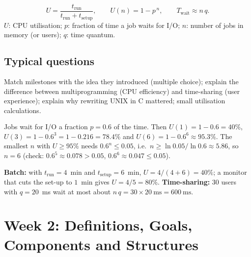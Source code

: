 \documentclass[11pt,a4paper]{article}
\begin{document}
\begin{keyidea}
\[
U = \frac{t_{\text{run}}}{t_{\text{run}} + t_{\text{setup}}}, \qquad
U(n) = 1 - p^{\,n}, \qquad
T_{\text{wait}} \approx n\,q .
\]
$U$: CPU utilisation; $p$: fraction of time a job waits for I/O; $n$: number of jobs in memory (or users); $q$: time quantum.
\end{keyidea}

\subsection*{Typical questions}
Match milestones with the idea they introduced (multiple choice); explain the difference between multiprogramming (CPU efficiency) and time-sharing (user experience); explain why rewriting UNIX in C mattered; small utilisation calculations.

\begin{example}
Jobs wait for I/O a fraction $p = 0.6$ of the time. Then $U(1) = 1 - 0.6 = 40\%$, $U(3) = 1 - 0.6^{3} = 1 - 0.216 = 78.4\%$ and $U(6) = 1 - 0.6^{6} \approx 95.3\%$. The smallest $n$ with $U \ge 95\%$ needs $0.6^{n} \le 0.05$, i.e.\ $n \ge \ln 0.05 / \ln 0.6 \approx 5.86$, so $n = 6$ (check: $0.6^{5} \approx 0.078 > 0.05$, $0.6^{6} \approx 0.047 \le 0.05$).

\textbf{Batch:} with $t_{\text{run}} = 4$~min and $t_{\text{setup}} = 6$~min, $U = 4/(4+6) = 40\%$; a monitor that cuts the set-up to $1$~min gives $U = 4/5 = 80\%$. \textbf{Time-sharing:} $30$ users with $q = 20$~ms wait at most about $n\,q = 30 \times 20\ \text{ms} = 600\ \text{ms}$.
\end{example}

\section{Week 2: Definitions, Goals, Components and Structures}
\label{sec:w2}
\end{document}
